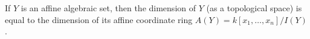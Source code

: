 If $Y$ is an affine algebraic set, then the dimension of $Y$ (as a topological space) is equal to the dimension of its affine coordinate ring $A(Y) = k[x_1,\ldots,x_n]/I(Y)$.
